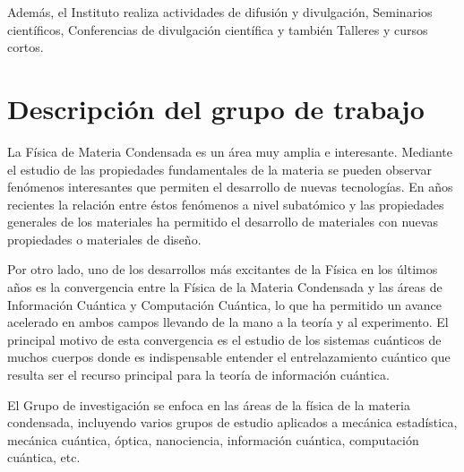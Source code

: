\documentclass[titlepage,11pt]{article}
\begin{document}
Además, el Instituto realiza actividades de difusión y divulgación, Seminarios
científicos, Conferencias de divulgación científica y también Talleres y
cursos cortos.


%
\section{Descripción del grupo de trabajo}
\label{sec:grupo}
La Física de Materia Condensada es un área muy amplia e interesante. Mediante
el estudio de las propiedades fundamentales de la materia se pueden observar
fenómenos interesantes que permiten el desarrollo de nuevas tecnologías. En
años recientes la relación entre éstos fenómenos a nivel subatómico y las
propiedades generales de los materiales ha permitido el desarrollo de
materiales con nuevas propiedades o materiales de diseño.

Por otro lado, uno de los desarrollos más excitantes de la Física en los
últimos años es la convergencia entre la Física de la Materia Condensada y las
áreas de Información Cuántica y Computación Cuántica, lo que ha permitido un
avance acelerado en ambos campos llevando de la mano a la teoría y al
experimento. El principal motivo de esta convergencia es el estudio de los
sistemas cuánticos de muchos cuerpos donde es indispensable entender el
entrelazamiento cuántico que resulta ser el recurso principal para la teoría
de información cuántica.

El Grupo de investigación se enfoca en las áreas de la física de la materia
condensada, incluyendo varios grupos de estudio aplicados a mecánica
estadística, mecánica cuántica, óptica, nanociencia, información cuántica,
computación cuántica, etc.


%
\end{document}
